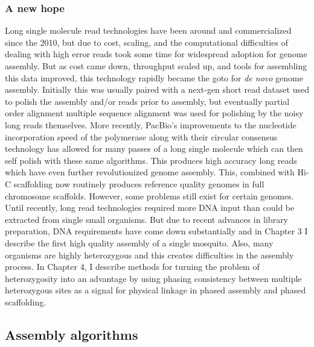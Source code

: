 \subsubsection{A new hope}

\par{
Long single molecule read technologies have been around and commercialized since the 2010, but due to cost, scaling, and the computational difficulties of dealing with high error reads took some time for widespread adoption for genome assembly\cite{HGAP}. But as cost came down, throughput scaled up, and tools for assembling this data improved\cite{falcon}\cite{redbean}\cite{canu}, this technology rapidly became the goto for \textit{de novo} genome assembly. Initially this was usually paired with a next-gen short read dataset used to polish the assembly and/or reads prior to assembly, but eventually partial order alignment multiple sequence alignment\cite{partialorder} was used for polishing by the noisy long reads themselves\cite{quiver}. More recently, PacBio's improvements to the nucleotide incorporation speed of the polymerase along with their circular consensus technology has allowed for many passes of a long single molecule which can then self polish with these same algorithms. This produces high accuracy long reads which have even further revolutionized genome assembly\cite{hifi}. This, combined with Hi-C scaffolding now routinely produces reference quality genomes in full chromosome scaffolds. However, some problems still exist for certain genomes. Until recently, long read technologies required more DNA input than could be extracted from single small organisms. But due to recent advances in library preparation, DNA requirements have come down substantially and in Chapter 3 I describe the first high quality assembly of a single mosquito. Also, many organisms are highly heterozygous and this creates difficulties in the assembly process. In Chapter 4, I describe methods for turning the problem of heterozygosity into an advantage by using phasing consistency between multiple heterozygous sites as a signal for physical linkage in phased assembly and phased scaffolding.
}

\subsection{Assembly algorithms}

